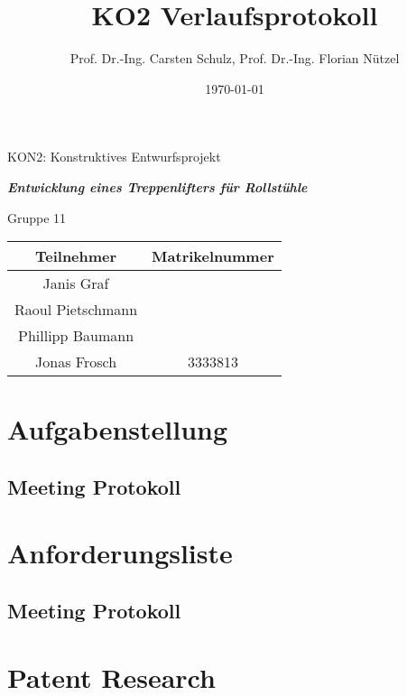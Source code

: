 \documentclass[10pt,a4paper]{article}
\author{{\LARGE Prof. Dr.-Ing. Carsten Schulz, Prof. Dr.-Ing. Florian Nützel}}
\title{\textbf{{\Huge KO2 Verlaufsprotokoll}}}
\date{{\Large \today}}
\begin{document}
\maketitle
\begin{center}

    \Large KON2: Konstruktives Entwurfsprojekt

    \vspace{1cm}

    \textbf{\textit{Entwicklung eines Treppenlifters für Rollstühle}}

    \vspace{1cm}

    {\Large Gruppe 11}
\end{center}

\begin{table}[b]
    \centering
    \begin{tabular}{|c|c|}
        \hline
        \textbf{Teilnehmer} & \textbf{Matrikelnummer} \\
        \hline
        Janis Graf          &                         \\
        \hline
        Raoul Pietschmann   &                         \\
        \hline
        Phillipp Baumann    &                         \\
        \hline
        Jonas Frosch        & 3333813                 \\
        \hline
    \end{tabular}
\end{table}

\newpage
\tableofcontents
\newpage

\section{Aufgabenstellung}
\subsection{Meeting Protokoll}
\section{Anforderungsliste}
\subsection{Meeting Protokoll}
\section{Patent Research}
\end{document}
